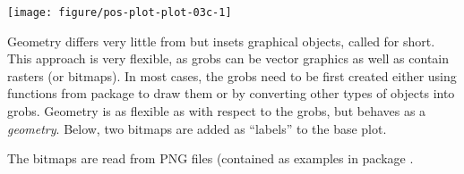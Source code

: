 \documentclass[krantz2]{krantz}\usepackage{knitr}
\begin{document}
\begin{knitrout}\footnotesize
{}\color{fgcolor}\begin{kframe}
\begin{alltt}
 \hlopt{+}
  \hlstd{(} \hlstd{=} \hlstd{,}  \hlstd{=} \hlstd{,}  \hlstd{=}   \hlstd{=} \hlopt{/}\hlstd{)} \hlopt{+}
  \hlstd{(} \hlstd{=} \hlstd{,}  \hlstd{=} \hlstd{,}  \hlstd{=} \hlstd{,}
            \hlstd{=} \hlstd{,}  \hlstd{=} \hlstd{,}  \hlstd{=} \hlstd{,}  \hlstd{=} \hlstd{,}
            \hlstd{=} \hlstd{)}
\end{alltt}
\end{kframe}

{\centering \texttt{[image: figure/pos-plot-plot-03c-1]} 

}


\end{knitrout}
Geometry  differs very little from  but insets  graphical objects, called  for short. This approach is very flexible, as grobs can be vector graphics as well as contain rasters (or bitmaps). In most cases, the grobs need to be first created either using functions from package  to draw them or by converting other types of objects into grobs. Geometry  is as flexible as  with respect to the grobs, but behaves as a \emph{geometry}. Below, two bitmaps are added as ``labels'' to the base plot.

The bitmaps are read from PNG files (contained as examples in package .

\begin{knitrout}\footnotesize
{}\color{fgcolor}\begin{kframe}
\begin{alltt}
 \hlkwb{<-}
  \hlstd{(}\hlstd{,} \hlstd{,}
               \hlstd{=} \hlstd{,}  \hlstd{=} \hlstd{)}
 \hlkwb{<-} \hlopt{::}
 \hlkwb{<-}
  \hlstd{(}\hlstd{,} \hlstd{,}
               \hlstd{=} \hlstd{,}  \hlstd{=} \hlstd{)}
 \hlkwb{<-} \hlopt{::}
\end{alltt}
\end{kframe}
\end{knitrout}
\end{document}
